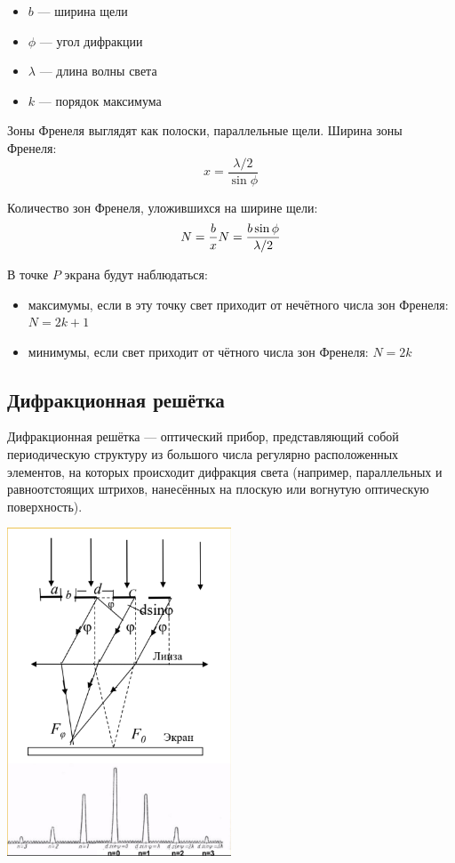 \documentclass[12pt]{report}
\begin{document}
\begin{itemize}
    \item $b$ --- ширина щели
    \item $\phi$ --- угол дифракции
    \item $\lambda$ --- длина волны света
    \item $k$ --- порядок максимума
\end{itemize}

Зоны Френеля выглядят как полоски, параллельные щели. Ширина зоны Френеля:
\[
    x = \dfrac{\lambda / 2}{\sin \phi}
\]

Количество зон Френеля, уложившихся на ширине щели:
\[
    N = \dfrac{b}{x} \\ N = \dfrac{b\sin \phi}{\lambda / 2}
\]

В точке $P$ экрана будут наблюдаться:
\begin{itemize}
    \item максимумы, если в эту точку свет приходит от нечётного числа зон Френеля: $N = 2k + 1$
    \item минимумы, если свет приходит от чётного числа зон Френеля: $N = 2k$
\end{itemize}

\subsection{Дифракционная решётка}
Дифракционная решётка — оптический прибор, представляющий собой периодическую структуру из большого числа регулярно расположенных элементов, на которых происходит дифракция света (например, параллельных и равноотстоящих штрихов, нанесённых на плоскую или вогнутую оптическую поверхность).

\begin{center}
    \includegraphics[width=0.5\textwidth]{graphics/06_1.png}
\end{center}
\end{document}
